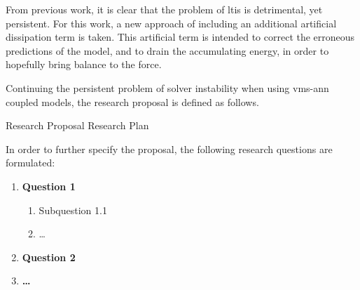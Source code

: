 From previous work, it is clear that the problem of \gls{lti}s is detrimental, yet persistent. For this work, a new approach of including an additional artificial dissipation term is taken. This artificial term is intended to correct the erroneous predictions of the model, and to drain the accumulating energy, in order to hopefully bring balance to the force. 

Continuing the persistent problem of solver instability when using \gls{vms}-\gls{ann} coupled models, the research proposal is defined as follows.

\begin{bluebox}{Research Proposal}
Research Plan
\end{bluebox}

In order to further specify the proposal, the following research questions are formulated:

\begin{enumerate}[label=\textbf{\color{titlecolor}\arabic*.}]

    \item \textbf{Question 1}
    \begin{enumerate}[label=\textbf{\color{titlecolor}\arabic{enumi}.\alph*}]
        \item Subquestion 1.1
        \item \ldots
    \end{enumerate}

    \item \textbf{Question 2}

    \item \textbf{\ldots}

        
\end{enumerate}

